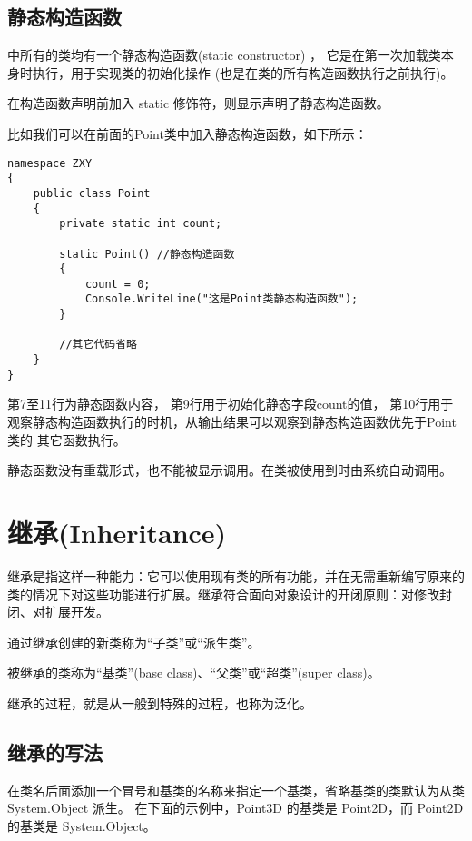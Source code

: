 \subsection{静态构造函数}
 \cs 中所有的类均有一个静态构造函数(static constructor) ，
 它是在第一次加载类本身时执行，用于实现类的初始化操作
 (也是在类的所有构造函数执行之前执行)。

 在构造函数声明前加入 static 修饰符，则显示声明了静态构造函数。

 比如我们可以在前面的Point类中加入静态构造函数，如下所示：

\begin{lstlisting}
namespace ZXY
{
    public class Point
    {
        private static int count;
            
        static Point() //静态构造函数
        {
            count = 0;
            Console.WriteLine("这是Point类静态构造函数");
        }

        //其它代码省略
    }
}
\end{lstlisting}

第7至11行为静态函数内容， 第9行用于初始化静态字段count的值，
第10行用于观察静态构造函数执行的时机，从输出结果可以观察到静态构造函数优先于Point类的
其它函数执行。

静态函数没有重载形式，也不能被显示调用。在类被使用到时由系统自动调用。


\section{继承(Inheritance)}

 继承是指这样一种能力：它可以使用现有类的所有功能，并在无需重新编写原来的类的情况下对这些功能进行扩展。继承符合面向对象设计的开闭原则：对修改封闭、对扩展开发。

通过继承创建的新类称为“子类”或“派生类”。

被继承的类称为“基类”(base class)、“父类”或“超类”(super class)。

继承的过程，就是从一般到特殊的过程，也称为泛化。



\subsection{继承的写法}

在类名后面添加一个冒号和基类的名称来指定一个基类，省略基类的类默认为从类 System.Object 派生。
在下面的示例中，Point3D 的基类是 Point2D，而 Point2D 的基类是 System.Object。

